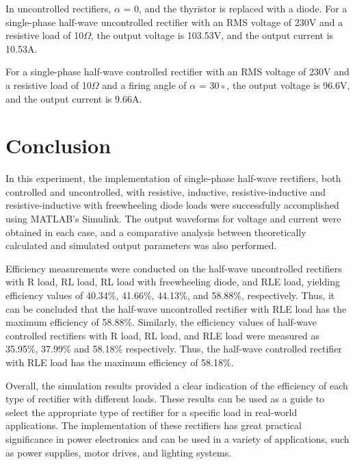 In uncontrolled rectifiers, $ \alpha$ = 0, and the thyristor is replaced with a diode.
For a single-phase half-wave uncontrolled rectifier with an RMS voltage of 230V
and a resistive load of 10$ \Omega $,
the output voltage is 103.53V, and the output current is 10.53A.

For a single-phase half-wave controlled rectifier with an RMS voltage of 230V
and a resistive load of 10$ \Omega $ and a firing angle of $ \alpha  $ = 30◦, the output voltage
is 96.6V, and the output current is 9.66A.

\pagebreak











\section{Conclusion}


\hspace{\parindent}

In this experiment, the implementation of single-phase half-wave rectifiers, both controlled and uncontrolled, with resistive, inductive, resistive-inductive and resistive-inductive with freewheeling diode loads were successfully accomplished using MATLAB's Simulink. The output waveforms for voltage and current were obtained in each case, and a comparative analysis between theoretically calculated and simulated output parameters was also performed.

Efficiency measurements were conducted on the half-wave uncontrolled rectifiers with R load, RL load, RL load with freewheeling diode, and RLE load, yielding efficiency values of 40.34\%, 41.66\%, 44.13\%, and 58.88\%, respectively. Thus, it can be concluded that the half-wave uncontrolled rectifier with RLE load has the maximum efficiency of 58.88\%. Similarly, the efficiency values of half-wave controlled rectifiers with R load, RL load, and RLE load were measured as 35.95\%, 37.99\% and 58.18\% respectively. Thus, the half-wave controlled rectifier with RLE load has the maximum efficiency of 58.18\%.

Overall, the simulation results provided a clear indication of the efficiency of each type of rectifier with different loads. These results can be used as a guide to select the appropriate type of rectifier for a specific load in real-world applications. The implementation of these rectifiers has great practical significance in power electronics and can be used in a variety of applications, such as power supplies, motor drives, and lighting systems.
\pagebreak
